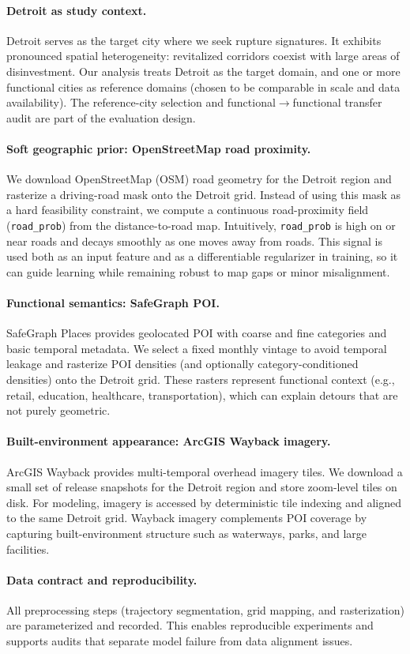 \paragraph{Detroit as study context.}
Detroit serves as the target city where we seek rupture signatures. It exhibits pronounced spatial heterogeneity: revitalized corridors coexist with large areas of disinvestment. Our analysis treats Detroit as the target domain, and one or more functional cities as reference domains (chosen to be comparable in scale and data availability). The reference-city selection and functional$\to$functional transfer audit are part of the evaluation design.

\paragraph{Soft geographic prior: OpenStreetMap road proximity.}
We download OpenStreetMap (OSM) road geometry for the Detroit region and rasterize a driving-road mask onto the Detroit grid. Instead of using this mask as a hard feasibility constraint, we compute a continuous road-proximity field (\texttt{road\_prob}) from the distance-to-road map. Intuitively, \texttt{road\_prob} is high on or near roads and decays smoothly as one moves away from roads. This signal is used both as an input feature and as a differentiable regularizer in training, so it can guide learning while remaining robust to map gaps or minor misalignment.

\paragraph{Functional semantics: SafeGraph POI.}
SafeGraph Places provides geolocated POI with coarse and fine categories and basic temporal metadata. We select a fixed monthly vintage to avoid temporal leakage and rasterize POI densities (and optionally category-conditioned densities) onto the Detroit grid. These rasters represent functional context (e.g., retail, education, healthcare, transportation), which can explain detours that are not purely geometric.

\paragraph{Built-environment appearance: ArcGIS Wayback imagery.}
ArcGIS Wayback provides multi-temporal overhead imagery tiles. We download a small set of release snapshots for the Detroit region and store zoom-level tiles on disk. For modeling, imagery is accessed by deterministic tile indexing and aligned to the same Detroit grid. Wayback imagery complements POI coverage by capturing built-environment structure such as waterways, parks, and large facilities.

\paragraph{Data contract and reproducibility.}
All preprocessing steps (trajectory segmentation, grid mapping, and rasterization) are parameterized and recorded. This enables reproducible experiments and supports audits that separate model failure from data alignment issues.
